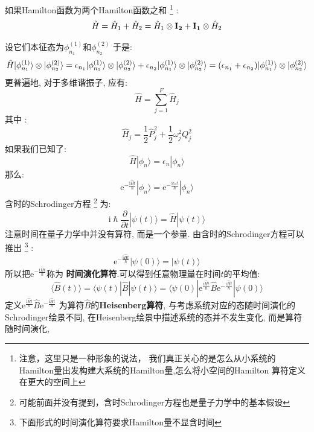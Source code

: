         \splitline

        如果Hamilton函数为两个Hamilton函数之和
        \footnote{注意，这里只是一种形象的说法，
        我们真正关心的是怎么从小系统的Hamilton量出发构建大系统的Hamilton量,怎么将小空间的Hamilton
        算符定义在更大的空间上}
        : 
        \begin{equation}
            \begin{split}
            \hat{H} = \hat{H}_1 + \hat{H}_2 = \hat{H}_1\otimes\mathbf{I_2} + \mathbf{I_1}\otimes\hat{H}_2
            \end{split}
        \end{equation}

        设它们本征态为$\phi_{n_1}^{(1)}$和$\phi_{n_2}^{(2)}$
        于是:
        \[\hat{H} |\phi_{n_1}^{(1)}\rangle\otimes\ket{\phi_{n_2}^{(2)}} = \epsilon_{n_1}|\phi_{n_1}^{(1)}\rangle\otimes\ket{\phi_{n_2}^{(2)}} + \epsilon_{n_2}|\phi_{n_1}^{(1)} \rangle \otimes \ket{\phi_{n_2}^{(2)}}  = (\epsilon_{n_1}+\epsilon_{n_2})|\phi_{n_1}^{(1)} \rangle \otimes\ket{\phi_{n_2}^{(2)}} \]
        更普遍地, 对于多维谐振子, 应有:
        \[ \hat{H} = \sum_{j=1}^F \hat{H}_j \]
        其中 :
        \[ \hat{H}_j = \frac 12 \hat{P}_j^2 + \frac 12 \omega_j^2 Q_j^2 \]
        如果我们已知了:
        \[ \hat{H}|\phi_n\rangle = \epsilon_n|\phi_n\rangle \]
        那么:
        \[ \mathrm{e}^{-\frac {\mathrm{i}\hat{H}t}{\hslash}}|\phi_n\rangle = \mathrm{e}^{-\frac {\mathrm{i}\epsilon_n t}{\hslash}}|\phi_n\rangle \]
        含时的Schrodinger方程
        \footnote{可能前面并没有提到，含时Schrodinger方程也是量子力学中的基本假设}
        为:
        \[ \mathrm{i}\hslash \frac {\partial}{\partial t}|\psi(t)\rangle = \hat{H} |\psi(t)\rangle \]
        注意时间在量子力学中并没有算符, 而是一个参量. 由含时的Schrodinger方程可以推出
        \footnote{下面形式的时间演化算符要求Hamilton量不显含时间}
        :
        \[ \mathrm{e}^{-\frac {\mathrm{i}\hat{H}t}{\hslash}}|\psi(0)\rangle = |\psi(t) \rangle \]
        所以把$\mathrm{e}^{-\frac {\mathrm{i}\hat{H}t}{\hslash}}$称为
        \textbf{时间演化算符}.可以得到任意物理量在时间$t$的平均值:
        \[ \langle \hat{B}(t) \rangle = \langle \psi(t)|\hat{B} | \psi(t) \rangle = \langle \psi(0) |\mathrm{e}^{\frac {\mathrm{i}\hat{H}t}{\hslash}} \hat{B} \mathrm{e}^{-\frac {\mathrm{i}\hat{H}t}{\hslash}}|\psi(0) \rangle \]
        定义$\mathrm{e}^{\frac {\mathrm{i}\hat{H}t}{\hslash}} \hat{B} \mathrm{e}^{-\frac {\mathrm{i}\hat{H}t}{\hslash}}$
        为算符$\hat{B}$的\textbf{Heisenberg算符},
         与考虑系统对应的态随时间演化的Schrodinger绘景不同, 
         在Heisenberg绘景中描述系统的态并不发生变化, 而是算符随时间演化, 
